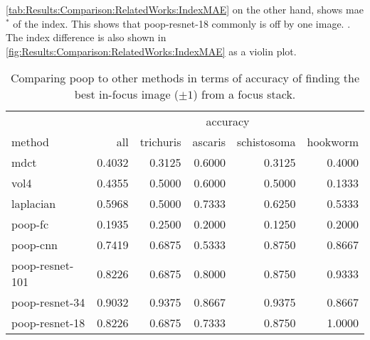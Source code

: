 \autoref{tab:Results:Comparison:RelatedWorks:IndexMAE} on the other hand, shows \ac{mae}$^*$ of the index. This shows that \acs{poop}-\acs{resnet}-18 commonly is off by one image. . The index difference is also shown in \autoref{fig:Results:Comparison:RelatedWorks:IndexMAE} as a violin plot. 


\begin{table}
    \centering
    \caption{Comparing \acs{poop} to other methods in terms of accuracy of finding the best in-focus image ($\pm 1$) from a focus stack.}
    \begin{tabular}{|l|rrrrr|}
        \hline
        \multicolumn{1}{|c}{} & \multicolumn{5}{|c|}{accuracy} \\
        method            & all & trichuris & ascaris & schistosoma & hookworm \\
        \hline
        \acs{mdct}      & 0.4032 & 0.3125 & 0.6000 & 0.3125 & 0.4000 \\
        \acs{vol4}      & 0.4355 & 0.5000 & 0.6000 & 0.5000 & 0.1333 \\
        \acs{laplacian} & 0.5968 & 0.5000 & 0.7333 & 0.6250 & 0.5333 \\
        \hline
        \acs{poop}-\acs{fc} & 0.1935 & 0.2500 & 0.2000 & 0.1250 & 0.2000 \\
        \acs{poop}-\acs{cnn}            & 0.7419 & 0.6875 & 0.5333 & 0.8750 & 0.8667 \\
        \acs{poop}-\acs{resnet}-101      & 0.8226 & 0.6875 & 0.8000 & 0.8750 & 0.9333 \\
        \acs{poop}-\acs{resnet}-34       & 0.9032 & 0.9375 & 0.8667 & 0.9375 & 0.8667 \\
        \acs{poop}-\acs{resnet}-18       & 0.8226 & 0.6875 & 0.7333 & 0.8750 & 1.0000 \\ 
        \hline
    \end{tabular}
    \label{tab:Results:Comparison:RelatedWorks:Accuracy}
\end{table}

